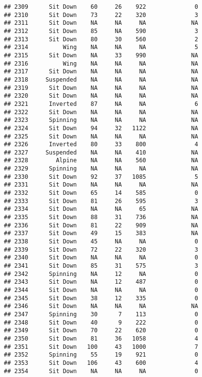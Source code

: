 \documentclass[
]{article}
\begin{document}
\begin{verbatim}
## 2309      Sit Down    60     26    922              0
## 2310      Sit Down    73     22    320              3
## 2311      Sit Down    NA     NA     NA             NA
## 2312      Sit Down    85     NA    590              3
## 2313      Sit Down    80     30    560              2
## 2314          Wing    NA     NA     NA              5
## 2315      Sit Down    NA     33    990             NA
## 2316          Wing    NA     NA     NA             NA
## 2317      Sit Down    NA     NA     NA             NA
## 2318     Suspended    NA     NA     NA             NA
## 2319      Sit Down    NA     NA     NA             NA
## 2320      Sit Down    NA     NA     NA             NA
## 2321      Inverted    87     NA     NA              6
## 2322      Sit Down    NA     NA     NA             NA
## 2323      Spinning    NA     NA     NA             NA
## 2324      Sit Down    94     32   1122             NA
## 2325      Sit Down    NA     NA     NA             NA
## 2326      Inverted    80     33    800              4
## 2327     Suspended    NA     NA    410             NA
## 2328        Alpine    NA     NA    560             NA
## 2329      Spinning    NA     NA     NA             NA
## 2330      Sit Down    92     37   1085              5
## 2331      Sit Down    NA     NA     NA             NA
## 2332      Sit Down    65     14    585              0
## 2333      Sit Down    81     26    595              3
## 2334      Sit Down    NA     NA     65             NA
## 2335      Sit Down    88     31    736             NA
## 2336      Sit Down    81     22    909             NA
## 2337      Sit Down    49     15    383             NA
## 2338      Sit Down    45     NA     NA              0
## 2339      Sit Down    72     22    320              3
## 2340      Sit Down    NA     NA     NA              0
## 2341      Sit Down    85     31    575              3
## 2342      Spinning    NA     12     NA              0
## 2343      Sit Down    NA     12    487              0
## 2344      Sit Down    NA     NA     NA              0
## 2345      Sit Down    38     12    335              0
## 2346      Sit Down    NA     NA     NA             NA
## 2347      Spinning    30      7    113              0
## 2348      Sit Down    40      9    222              0
## 2349      Sit Down    70     22    620              0
## 2350      Sit Down    81     36   1058              4
## 2351      Sit Down   100     43   1000              7
## 2352      Spinning    55     19    921              0
## 2353      Sit Down   106     43    600              4
## 2354      Sit Down    NA     NA     NA              0

\end{verbatim}
\end{document}
